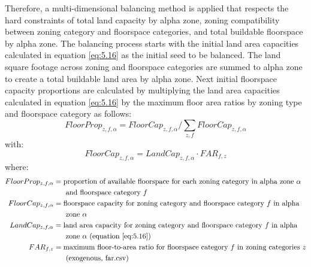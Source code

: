 Therefore, a multi-dimensional balancing method is applied that respects the hard constraints of total land capacity by alpha zone, zoning compatibility between zoning category and floorspace categories, and total buildable floorspace by alpha zone. The balancing process starts with the initial land area capacities calculated in equation \ref{eq:5.16} as the initial seed to be balanced. The land square footage across zoning and floorspace categories are summed to alpha zone to create a total buildable land area by alpha zone.  Next initial floorspace capacity proportions are calculated by multiplying the land area capacities calculated in equation \ref{eq:5.16} by the maximum floor area ratios by zoning type and floorspace category as follows:
\begin{equation}\label{eq:5.17}    %
FloorProp_{z,f,\alpha} = FloorCap_{z,f,\alpha} / \sum_{z,f} FloorCap_{z,f,\alpha}
\end{equation}
\noindent with: 
\begin{equation}    %
FloorCap_{z,f,\alpha} = LandCap_{z,f,\alpha} \cdot FAR_{f,z}
\end{equation}
\noindent where:
\begin{align*}
FloorProp_{z,f,\alpha} &= \text{proportion of available floorspace for each zoning category in alpha zone $\alpha$} \\
 &~~~~~\text{and floorspace category $f$} \\
FloorCap_{z,f,\alpha} &= \text{floorspace capacity for zoning category and floorspace category $f$ in alpha} \\
 &~~~~~\text{zone $\alpha$} \\
LandCap_{z,f,\alpha} &= \text{land area capacity for zoning category and floorspace category $f$ in alpha} \\
 &~~~~~\text{zone $\alpha$ (equation \ref{eq:5.16})} \\
FAR_{f,z} &= \text{maximum floor-to-area ratio for floorspace category $f$ in zoning categories $z$} \\
 &~~~~~\text{(exogenous, far.csv)}
\end{align*}

